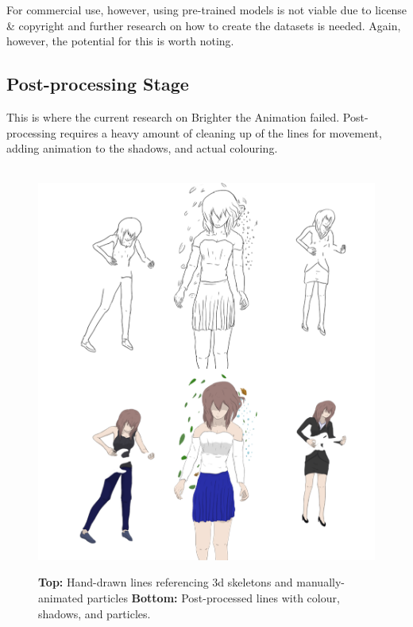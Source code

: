 For commercial use, however, using pre-trained models is not viable due to license \& copyright and further research on how to create the datasets is needed. Again, however, the potential for this is worth noting.

\subsection{Post-processing Stage}

This is where the current research on Brighter the Animation failed. Post-processing requires a heavy amount of cleaning up of the lines for movement, adding animation to the shadows, and actual colouring.\\\\

\begin{figure}[t]
    \centering
    \includegraphics[width=1\linewidth]{img/results/postprocess.pdf} \\
    \caption{\textbf{Top:} {{Hand-drawn lines referencing 3d skeletons and manually-animated particles}} \textbf{Bottom:} {{Post-processed lines with colour, shadows, and particles}}.}
    \vspace{-15pt}
    \label{fig:postprocess}
\end{figure}

